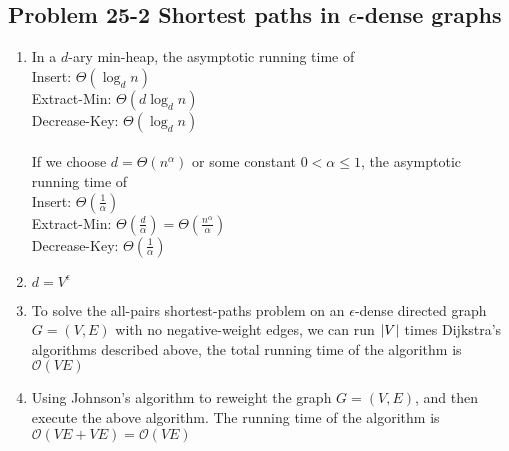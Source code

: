 \subsection*{Problem 25-2 Shortest paths in $\epsilon$-dense graphs}
\begin{enumerate}
	\item	In a $d$-ary min-heap, the asymptotic running time of \\
		Insert: $\Theta(\log_d{n})$ \\
		Extract-Min: $\Theta(d\log_d{n})$ \\
		Decrease-Key: $\Theta(\log_d{n})$ \\ \\
		If we choose $d = \Theta(n^\alpha)$ or some constant $0 < \alpha \leq 1$, the asymptotic running time of \\
		Insert: $\Theta(\frac{1}{\alpha})$ \\
		Extract-Min: $\Theta(\frac{d}{\alpha}) = \Theta(\frac{n^\alpha}{\alpha})$ \\
		Decrease-Key: $\Theta(\frac{1}{\alpha})$
	\item	$d = V^\epsilon$
	\item	To solve the all-pairs shortest-paths problem on an $\epsilon$-dense directed graph $G = (V, E)$ with no negative-weight edges, we can run $\left\lvert V \right\rvert$ times Dijkstra's algorithms described above, the total running time of the algorithm is $\mathcal{O}(VE)$
	\item	Using Johnson's algorithm to reweight the graph $G = (V, E)$, and then execute the above algorithm. The running time of the algorithm is $\mathcal{O}(VE + VE) = \mathcal{O}(VE)$
\end{enumerate}

